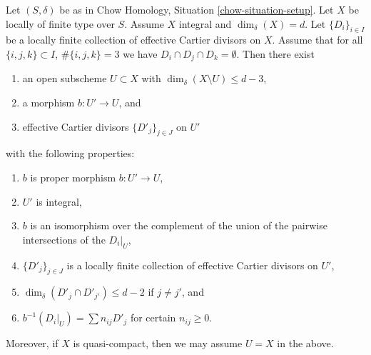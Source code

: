 %
\begin{lemma}
\label{lemma-blowing-up-intersections}
Let $(S, \delta)$ be as in Chow Homology, Situation \ref{chow-situation-setup}.
Let $X$ be locally of finite type over $S$.
Assume $X$ integral and $\dim_\delta(X) = d$.
Let $\{D_i\}_{i \in I}$ be a locally finite collection of
effective Cartier divisors on $X$.
Assume that for all $\{i, j, k\} \subset I$, $\#\{i, j, k\} = 3$
we have $D_i \cap D_j \cap D_k = \emptyset$.
Then there exist
\begin{enumerate}
\item an open subscheme $U \subset X$ with
$\dim_\delta(X \setminus U) \leq d - 3$,
\item a morphism $b : U' \to U$, and
\item effective Cartier divisors $\{D'_j\}_{j \in J}$ on $U'$
\end{enumerate}
with the following properties:
\begin{enumerate}
\item $b$ is proper morphism $b : U' \to U$,
\item $U'$ is integral,
\item $b$ is an isomorphism over the complement of the union of the pairwise
intersections of the $D_i|_U$,
\item $\{D'_j\}_{j \in J}$ is a locally finite collection of effective
Cartier divisors on $U'$,
\item $\dim_\delta(D'_j \cap D'_{j'}) \leq d - 2$ if $j \not = j'$, and
\item $b^{-1}(D_i|_U) = \sum n_{ij} D'_j$ for certain $n_{ij} \geq 0$.
\end{enumerate}
Moreover, if $X$ is quasi-compact, then we may assume $U = X$ in the above.
\end{lemma}

